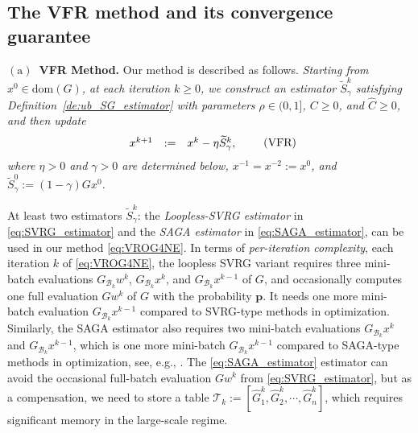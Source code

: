 \documentclass{article}
\newcommand{\dom}[1]{\mathrm{dom}(#1)}
\newcommand{\Bc}{\mathcal{B}}
\newcommand{\Tc}{\mathcal{T}}
\newcommand{\mbf}[1]{\mathbf{#1}}
\newcommand{\aftersubsec}{\vspace{-1.5ex}}
\theoremstyle{plain}
\theoremstyle{definition}
\theoremstyle{remark}
\begin{document}
\subsection{The VFR method and its convergence guarantee}\label{subsec:OG_method}
\aftersubsec
\vspace{0.5ex}
\textbf{$\mathrm{(a)}$~VFR Method.}
Our method is described as follows.
\textit{
Starting from $x^0 \in \dom{G}$,  at each iteration $k \geq 0$, we construct an estimator $\widetilde{S}_{\gamma}^k$ satisfying Definition~\ref{de:ub_SG_estimator} with parameters $\rho \in (0, 1]$,  $ C \geq 0$, and $\hat{C} \geq 0$,  and then update
\vspace{-1ex}
\begin{equation}\label{eq:VROG4NE}
\begin{array}{lcl}
x^{k+1} &:= & x^k - \eta \widetilde{S}_{\gamma}^k,
\end{array}
\tag{VFR}
\vspace{-1ex}
\end{equation}
where $\eta > 0$ and $\gamma > 0$  are  determined below, $x^{-1} = x^{-2} := x^0$, and $\widetilde{S}_{\gamma}^0 := (1-\gamma)Gx^0$.}

At least two estimators  $\widetilde{S}_{\gamma}^k$: the \textit{Loopless-SVRG estimator} in \eqref{eq:SVRG_estimator} and the \textit{SAGA estimator} in \eqref{eq:SAGA_estimator}, can be used in our method \eqref{eq:VROG4NE}.
In terms of \textit{per-iteration complexity}, each iteration $k$ of \ref{eq:VROG4NE}, the loopless SVRG variant requires three mini-batch evaluations $G_{\Bc_k}w^k$, $G_{\Bc_k}x^k$, and $G_{\Bc_k}x^{k-1}$ of $G$, and occasionally computes one full evaluation $Gw^k$ of $G$ with the probability $\mbf{p}$.
It needs one more mini-batch evaluation $G_{\Bc_k}x^{k-1}$ compared to SVRG-type methods in optimization.
Similarly, the SAGA estimator also requires two mini-batch evaluations $G_{\Bc_k}x^k$ and $G_{\Bc_k}x^{k-1}$, which is one more mini-batch $G_{\Bc_k}x^{k-1}$ compared to SAGA-type methods in optimization, see, e.g., \cite{reddi2016fast}.
The \ref{eq:SAGA_estimator} estimator can avoid the occasional full-batch evaluation $Gw^k$ from \ref{eq:SVRG_estimator}, but as a compensation, we need to store a table  $\Tc_k := [\hat{G}_1^k, \hat{G}_2^k, \cdots, \hat{G}_n^k]$, which requires significant memory in the large-scale regime.
\end{document}
